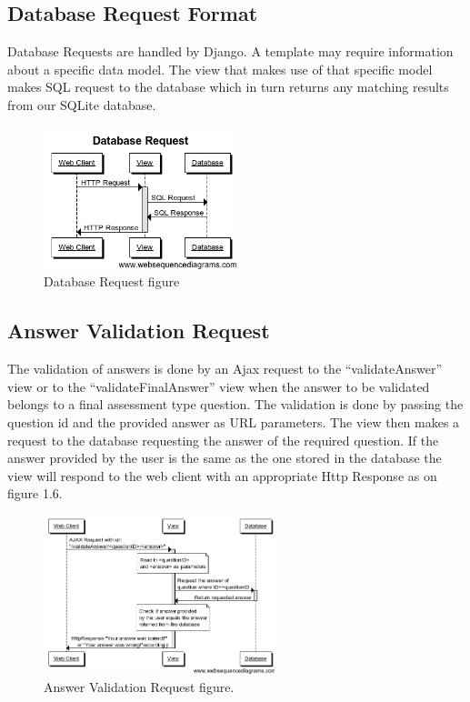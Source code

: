 \documentclass{l3proj}
\begin{document}
{\subsection{Database Request Format}
Database Requests are handled by Django. A template may require information about a specific data model. The view that makes use of that specific model makes SQL request to the database which in turn returns any matching results from our SQLite database.
\begin{figure}[h!]
   \caption{Database Request figure}
   \centering
     \includegraphics[width=0.5\textwidth]{images/databaseMessagePassing.png}
\end{figure}

\subsection{Answer Validation Request}
The validation of answers is done by an Ajax request to  the “validateAnswer” view or to the “validateFinalAnswer” view when the answer to be validated belongs to a final assessment type question. The validation is done by passing the question id and the provided answer as URL parameters. The view  then makes a request to the database requesting the answer of the required question. If the answer provided by the user is the same as the one stored in the database the view will respond to the web client with an appropriate Http Response as on figure 1.6.
\begin{figure}[h!]
   \caption{Answer Validation Request figure.}
   \centering
     \includegraphics[width=0.6\textwidth]{images/validateAnswerRequest.png}
\end{figure} 

}
\end{document}
